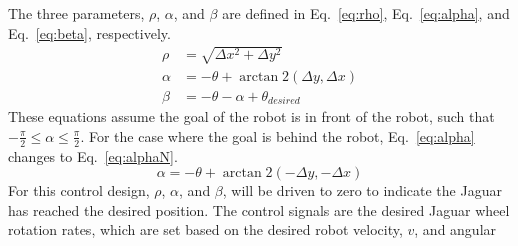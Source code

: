 \documentclass[conference]{../IEEEtran}
\begin{document}
\begin{table}[htb]
  \label{table:ptTrackVar}
\end{table}
%
The three parameters, $\rho$, $\alpha$, and $\beta$ are defined in Eq.~\ref{eq:rho},
Eq.~\ref{eq:alpha}, and Eq.~\ref{eq:beta}, respectively.
\begin{align}
\rho &= \sqrt{\Delta x^2+\Delta y^2}
\label{eq:rho}\\
\alpha &= -\theta + \arctan 2(\Delta y, \Delta x)
\label{eq:alpha}\\
\beta &= -\theta - \alpha + \theta_{desired}
\label{eq:beta}
\end{align}
These equations assume the goal of the robot is in front of the robot, such that
$-\frac{\pi}{2} \leq \alpha \leq \frac{\pi}{2}$. For the case where the goal is behind the
robot, Eq.~\ref{eq:alpha} changes to Eq.~\ref{eq:alphaN}.
\begin{equation}
\alpha = -\theta + \arctan 2(-\Delta y, -\Delta x)
\label{eq:alphaN}
\end{equation}
For this control design, $\rho$, $\alpha$, and $\beta$, will be driven to zero to indicate
the Jaguar has reached the desired position. The control signals are the desired Jaguar
wheel rotation rates, which are set based on the desired robot velocity, $v$, and angular
\end{document}
